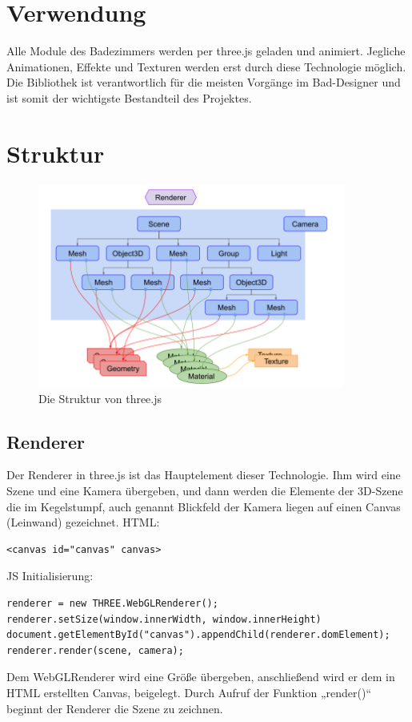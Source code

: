 \section*{Verwendung}
Alle Module des Badezimmers werden per three.js geladen und animiert. Jegliche Animationen, Effekte und Texturen werden erst durch diese Technologie möglich. Die Bibliothek ist verantwortlich für die meisten Vorgänge im Bad-Designer und ist somit der wichtigste Bestandteil des Projektes.

\newpage
\clearpage

\section*{Struktur}
\cite{Fundamentals_English}
\cite{Fundamentals_German}
\begin{figure}[h]
    \centering
    \includegraphics[width=0.9\textwidth]{images/threejs-structure.png}
    \caption{Die Struktur von three.js \cite{threejs_structure}}
    \label{fig:my_label}
\end{figure}

\subsection*{Renderer}
Der Renderer in three.js ist das Hauptelement dieser Technologie. Ihm wird eine Szene und eine Kamera übergeben, und dann werden die Elemente der 3D-Szene die im Kegelstumpf, auch genannt Blickfeld der Kamera liegen auf einen Canvas (Leinwand) gezeichnet.
HTML:
\begin{verbatim}
<canvas id="canvas" canvas>
\end{verbatim}
JS Initialisierung:
\begin{verbatim}
renderer = new THREE.WebGLRenderer();
renderer.setSize(window.innerWidth, window.innerHeight)
document.getElementById("canvas").appendChild(renderer.domElement);
renderer.render(scene, camera);
\end{verbatim}
Dem WebGLRenderer wird eine Größe übergeben, anschließend wird er dem in HTML erstellten Canvas, beigelegt. Durch Aufruf der Funktion „render()“ beginnt der Renderer die Szene zu zeichnen.
